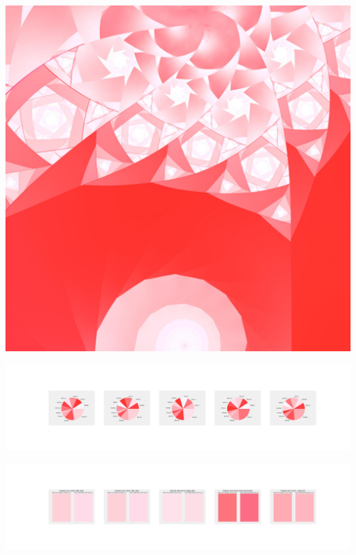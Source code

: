\documentclass[11pt]{article}
\begin{document}
\begin{landscape}
    \begin{center}
    \includegraphics[width=\textwidth]{./nbimg/file (421).jpg}
    \end{center}

    \begin{center}
    \includegraphics[width=250mm]{./nbimg/pie-358.jpg}
    \end{center}

    \begin{center}
    \includegraphics[width=250mm]{./nbimg/peak-358.jpg}
    \end{center}
    


\end{landscape}
\end{document}
